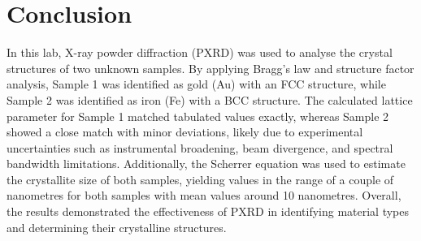\section{Conclusion}
In this lab, X-ray powder diffraction (PXRD) was used to analyse the crystal structures of two unknown samples. By applying Bragg’s law and structure factor analysis, Sample 1 was identified as gold (Au) with an FCC structure, while Sample 2 was identified as iron (Fe) with a BCC structure. The calculated lattice parameter for Sample 1 matched tabulated values exactly, whereas Sample 2 showed a close match with minor deviations, likely due to experimental uncertainties such as instrumental broadening, beam divergence, and spectral bandwidth limitations. Additionally, the Scherrer equation was used to estimate the crystallite size of both samples, yielding values in the range of a couple of nanometres for both samples with mean values around 10 nanometres. Overall, the results demonstrated the effectiveness of PXRD in identifying material types and determining their crystalline structures.

